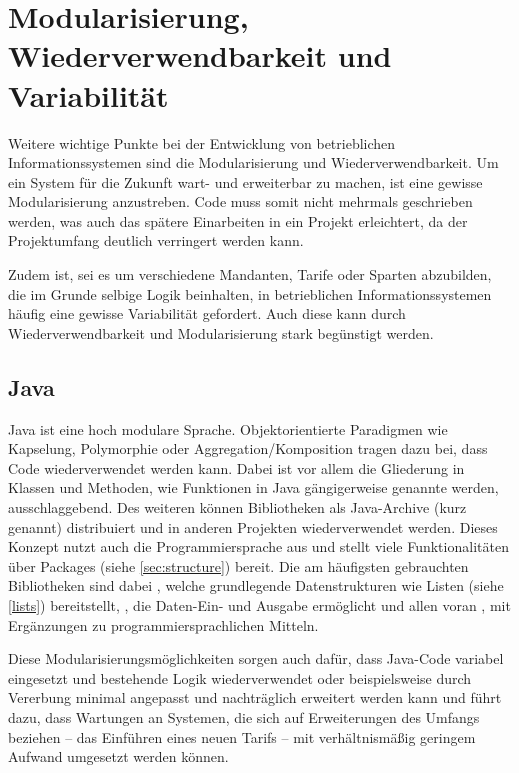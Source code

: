 \section{Modularisierung, Wiederverwendbarkeit und Variabilität}

Weitere wichtige Punkte bei der Entwicklung von betrieblichen Informationssystemen sind die Modularisierung und Wiederverwendbarkeit. Um ein System für die Zukunft wart- und erweiterbar zu machen, ist eine gewisse Modularisierung anzustreben. Code muss somit nicht mehrmals geschrieben werden, was auch das spätere Einarbeiten in ein Projekt erleichtert, da der Projektumfang deutlich verringert werden kann. 

Zudem ist, sei es um \zB verschiedene Mandanten, Tarife oder Sparten abzubilden, die im Grunde selbige Logik beinhalten, in betrieblichen Informationssystemen häufig eine gewisse Variabilität gefordert. Auch diese kann durch Wiederverwendbarkeit und Modularisierung stark begünstigt werden.

\subsection*{Java}
Java ist eine hoch modulare Sprache. Objektorientierte Paradigmen wie Kapselung, Polymorphie oder Aggregation/Komposition tragen dazu bei, dass Code wiederverwendet werden kann. Dabei ist vor allem die Gliederung in Klassen und Methoden, wie Funktionen in Java gängigerweise genannte werden, ausschlaggebend. Des weiteren können Bibliotheken als Java-Archive (kurz  genannt) dis­tri­bu­ie­rt und in anderen Projekten wiederverwendet werden. Dieses Konzept nutzt auch die Programmiersprache aus und stellt viele Funktionalitäten über Packages (siehe \autoref{sec:structure}) bereit. Die am häufigsten gebrauchten Bibliotheken sind dabei , welche grundlegende Datenstrukturen wie \zB Listen (siehe \autoref{lists}) bereitstellt, , die Daten-Ein- und Ausgabe ermöglicht und allen voran , mit Ergänzungen zu programmiersprachlichen Mitteln. 

Diese Modularisierungsmöglichkeiten sorgen auch dafür, dass Java-Code variabel eingesetzt und bestehende Logik wiederverwendet oder beispielsweise durch Vererbung minimal angepasst und nachträglich erweitert werden kann und führt dazu, dass Wartungen an Systemen, die sich auf Erweiterungen des Umfangs beziehen -- \zB das Einführen eines neuen Tarifs -- mit verhältnismäßig geringem Aufwand umgesetzt werden können.

